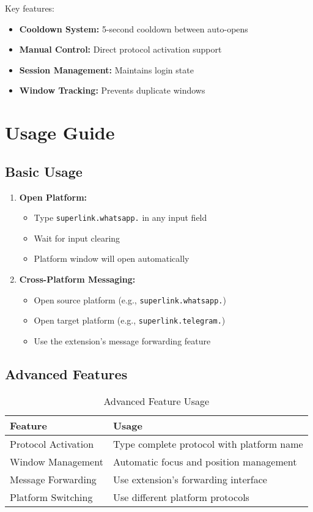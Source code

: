 \documentclass[12pt]{article}
\begin{document}
Key features:
\begin{itemize}
    \item \textbf{Cooldown System:} 5-second cooldown between auto-opens
    \item \textbf{Manual Control:} Direct protocol activation support
    \item \textbf{Session Management:} Maintains login state
    \item \textbf{Window Tracking:} Prevents duplicate windows
\end{itemize}

\section{Usage Guide}
\subsection{Basic Usage}
\begin{enumerate}[leftmargin=*]
    \item \textbf{Open Platform:}
    \begin{itemize}
        \item Type \texttt{superlink.whatsapp.} in any input field
        \item Wait for input clearing
        \item Platform window will open automatically
    \end{itemize}
    
    \item \textbf{Cross-Platform Messaging:}
    \begin{itemize}
        \item Open source platform (e.g., \texttt{superlink.whatsapp.})
        \item Open target platform (e.g., \texttt{superlink.telegram.})
        \item Use the extension's message forwarding feature
    \end{itemize}
\end{enumerate}

\subsection{Advanced Features}
\begin{table}[H]
\centering
\begin{tabular}{ll}
\toprule
\textbf{Feature} & \textbf{Usage} \\
\midrule
Protocol Activation & Type complete protocol with platform name \\
Window Management & Automatic focus and position management \\
Message Forwarding & Use extension's forwarding interface \\
Platform Switching & Use different platform protocols \\
\bottomrule
\end{tabular}
\caption{Advanced Feature Usage}
\end{table}
\end{document}
